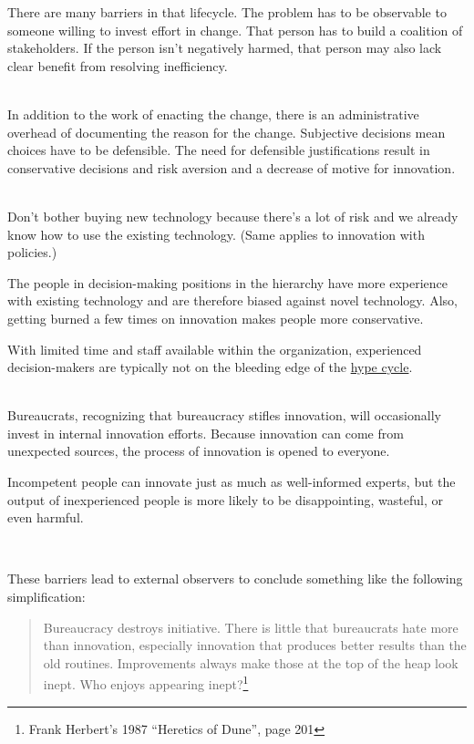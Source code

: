 There are many barriers in that lifecycle. The problem has to be observable to someone willing to invest effort in change. That person has to build a coalition of stakeholders. If the person isn't negatively harmed, that person may also lack clear benefit from resolving inefficiency. 

\ \\

In addition to the work of enacting the change, there is an administrative overhead of documenting the reason for the change. 
Subjective decisions mean choices have to be defensible. 
The need for defensible justifications result in conservative decisions and risk aversion and a decrease of motive for innovation. 

\ \\

Don't bother buying new technology because there's a lot of risk and we already know how to use the existing technology. (Same applies to innovation with policies.)

The people in decision-making positions in the hierarchy have more experience with existing technology and are therefore biased against novel technology. Also, getting burned a few times on innovation makes people more conservative.

With limited time and staff available within the organization, experienced decision-makers are typically not on the bleeding edge of the \href{https://en.wikipedia.org/wiki/Gartner_hype_cycle}{hype cycle}.

\ \\

Bureaucrats, recognizing that bureaucracy stifles innovation, will occasionally invest in internal innovation efforts. Because innovation can come from unexpected sources, the process of innovation is opened to everyone. 

Incompetent people can innovate just as much as well-informed experts, but the output of inexperienced people is more likely to be disappointing, wasteful, or even harmful. 

\ \\

\begin{samepage}
These barriers lead to external observers to conclude something like the following simplification:
\begin{quote}
Bureaucracy destroys initiative. There is little that bureaucrats hate more than innovation, especially innovation that produces better results than the old routines.
Improvements always make those at the top of the heap look inept. Who enjoys appearing inept?\footnote{Frank Herbert's 1987 ``Heretics of Dune'', page 201}%
\end{quote}
\end{samepage}
